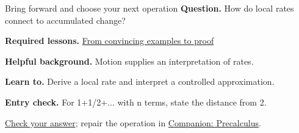 \begin{learningcard}{Bring forward and choose your next operation}
\textsf{\textbf{Question.}} How do local rates connect to accumulated change?\par
\textbf{Required lessons.} \hyperref[learn:proof]{From convincing examples to proof}\par
\textbf{Helpful background.} Motion supplies an interpretation of rates.\par
\textbf{Learn to.} Derive a local rate and interpret a controlled approximation.\par
\textbf{Entry check.} For 1+1/2+... with n terms, state the distance from 2.\par
\hyperref[solution:entry:calculus]{Check your answer}; repair the operation in \href{https://github.com/Oichkatzelesfrettschen/precalc_paper}{Companion: Precalculus}.
\end{learningcard}
